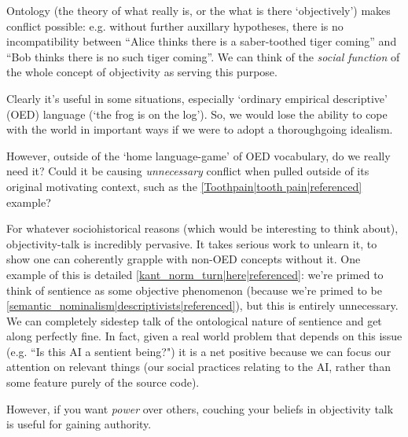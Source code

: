 Ontology (the theory of what really is, or the what is there `objectively') makes conflict possible: e.g. without further auxillary hypotheses, there is no incompatibility between ``Alice thinks there is a saber-toothed tiger coming'' and ``Bob thinks there is no such tiger coming''. We can think of the \emph{social function} of the whole concept of objectivity as serving this purpose.

Clearly it's useful in some situations, especially `ordinary empirical descriptive' (OED) language (`the frog is on the log'). So, we would lose the ability to cope with the world in important ways if we were to adopt a thoroughgoing idealism.

However, outside of the `home language-game' of OED vocabulary, do we really need it? Could it be causing \emph{unnecessary} conflict when pulled outside of its original motivating context, such as the \ref{Toothpain|tooth pain|referenced} example?

For whatever sociohistorical reasons (which would be interesting to think about), objectivity-talk is incredibly pervasive. It takes serious work to unlearn it, to show one can coherently grapple with non-OED concepts without it. One example of this is detailed \ref{kant_norm_turn|here|referenced}: we're primed to think of sentience as some objective phenomenon (because we're primed to be \ref{semantic_nominalism|descriptivists|referenced}), but this is entirely unnecessary. We can completely sidestep talk of the ontological nature of sentience and get along perfectly fine. In fact, given a real world problem that depends on this issue (e.g. ``Is this AI a sentient being?") it is a net positive because we can focus our attention on relevant things (our social practices relating to the AI, rather than some feature purely of the source code).

However, if you want \emph{power} over others, couching your beliefs in objectivity talk is useful for gaining authority.